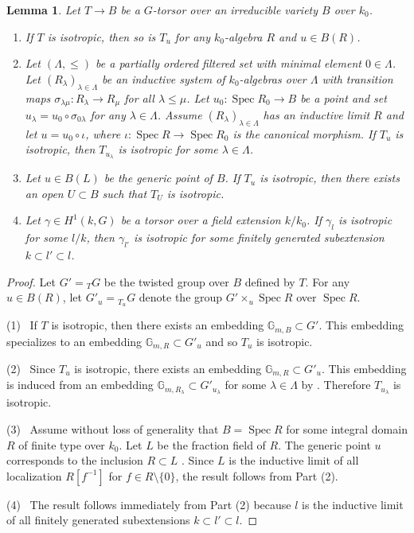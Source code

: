 \documentclass[12pt]{amsart}
\numberwithin{equation}{section}
\newtheorem{lemma}[theorem]{Lemma}
\theoremstyle{definition}
\newcommand{\Spec}{\operatorname{Spec}}
\begin{document}
\begin{lemma}\label{lem.isotrop_induct_lim}
    Let $T\to B$ be a $G$-torsor over an irreducible variety $B$ over $k_0$.
    \begin{enumerate}
        \item If $T$ is isotropic, then so is $T_u$ for any  $k_0$-algebra $R$ and $u\in B(R)$.
        \item Let $(\Lambda ,\leq)$ be a partially ordered filtered set with minimal element $0\in \Lambda$. Let $(R_\lambda)_{\lambda\in \Lambda}$ be an inductive system of $k_0$-algebras over $\Lambda$ with transition maps $\sigma_{\lambda \mu} :R_\lambda \to R_{\mu}$ for all $\lambda \leq \mu$. Let $u_0: \Spec R_0 \to B$ be a point and set $u_\lambda = u_0\circ \sigma_{0 \lambda}$ for any $\lambda\in \Lambda$. Assume $(R_\lambda)_{\lambda\in\Lambda}$ has an inductive limit $R$ and let $u = u_0 \circ \iota$, where $\iota: \Spec R \to \Spec R_0$ is the canonical morphism.  If $T_u$ is isotropic, then $T_{u_\lambda}$ is isotropic for some $\lambda\in \Lambda$.
        \item Let $u \in B(L)$ be the generic point of $B$. If $T_u$ is isotropic, then there exists an open $U\subset B$ such that $T_U$ is isotropic.
        \item Let $\gamma \in H^1(k,G)$ be a torsor over a field extension $k/k_0$. If $\gamma_l$ is isotropic for some $l/k$, then $\gamma_{l'}$ is isotropic for some finitely generated subextension $k\subset l'\subset l$.
    \end{enumerate}
\end{lemma}
\begin{proof}
Let $G' = {}_T G$ be the twisted group over $B$ defined by $T$. For any $u\in B(R)$, let $G'_u = {}_{T_u} G$ denote the group $G'\times_{u} \Spec R$ over $\Spec R$. 

(1) \ If $T$ is isotropic, then there exists an embedding $\mathbb{G}_{m,B} \subset G'$. This embedding specializes to an embedding $\mathbb{G}_{m,R} \subset G'_u$ and so $T_u$ is  isotropic. 

\smallskip
(2) \  Since $T_u$ is isotropic, there exists an embedding $\mathbb{G}_{m,R} \subset G'_u$. This embedding is induced from an embedding $\mathbb{G}_{m,R_\lambda}\subset G'_{u_\lambda}$ for some $\lambda\in \Lambda$ by \cite[Lemma 10.62]{gortz2010algebraic}. Therefore $T_{u_\lambda}$ is isotropic. 

\smallskip
(3) \ Assume without loss of generality that $B = \Spec R$ for some integral domain $R$ of finite type over $k_0$. Let $L$ be the fraction field of $R$. The generic point $u$ corresponds to the inclusion $R\subset L$ . Since $L$ is the inductive limit of all localization $R[f^{-1}]$ for $f\in R\setminus\{0\}$, the result follows from Part (2).

(4) \ The result follows immediately from Part (2) because $l$ is the inductive limit of all finitely generated subextensions $k\subset l'\subset l$.
\end{proof}
\end{document}
